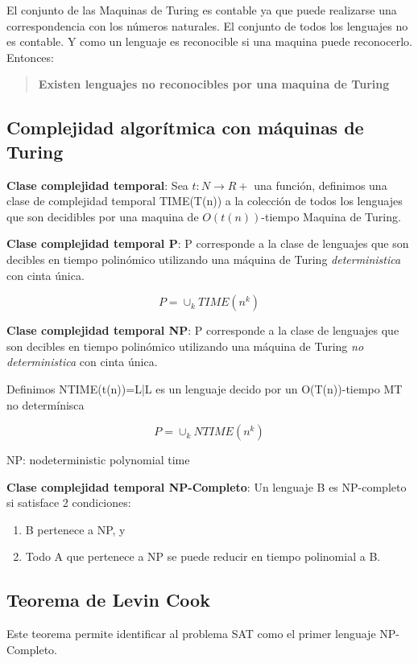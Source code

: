 \documentclass{article}
\begin{document}
El conjunto de las Maquinas de Turing es contable ya que puede realizarse una correspondencia con los
números naturales. El conjunto de todos los lenguajes no es contable. Y como un lenguaje es reconocible
si una maquina puede reconocerlo. Entonces: 

\begin{quote}
    \textbf{Existen lenguajes no reconocibles por una maquina de Turing}
\end{quote}

\newpage
\subsection{Complejidad algorítmica con máquinas de Turing}

\textbf{Clase complejidad temporal}: Sea \(t:N \rightarrow R+\) una función, definimos una clase
de complejidad temporal TIME(T(n)) a la colección de todos los lenguajes que son decidibles por una
maquina de \(O(t(n))\)-tiempo Maquina de Turing.

\textbf{Clase complejidad temporal P}: P corresponde a la clase de lenguajes que son decibles en
tiempo polinómico utilizando una máquina de Turing \textit{deterministica} con cinta única.

\[
    P=\cup_k TIME(n^k)
\]

\textbf{Clase complejidad temporal NP}: P corresponde a la clase de lenguajes que son decibles en
tiempo polinómico utilizando una máquina de Turing \textit{no deterministica} con cinta única.

Definimos NTIME(t(n))={L|L es un lenguaje decido por un O(T(n))-tiempo MT no determínisca}

\[
    P=\cup_k NTIME(n^k)
\]

NP: nodeterministic polynomial time

\textbf{Clase complejidad temporal NP-Completo}: Un lenguaje B es NP-completo si satisface 2 condiciones:

\begin{enumerate}
    \item B pertenece a NP, y 
    \item Todo A que pertenece a NP se puede reducir en tiempo polinomial a B.
\end{enumerate}


\newpage
\subsection{Teorema de Levin Cook}

Este teorema permite identificar al problema SAT como el primer lenguaje NP-Completo.
\end{document}
